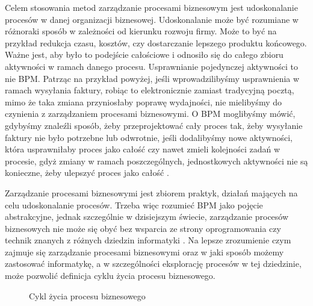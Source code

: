 Celem stosowania metod zarządzanie procesami biznesowym jest udoskonalanie procesów w danej organizacji biznesowej. Udoskonalanie może być rozumiane w różnoraki sposób w zależności od kierunku rozwoju firmy. Może to być na przykład redukcja czasu, kosztów, czy dostarczanie lepszego produktu końcowego. Ważne jest, aby było to podejście całościowe i odnosiło się do całego zbioru aktywności w ramach danego procesu. Usprawnianie pojedynczej aktywności to nie BPM. Patrząc na przykład powyżej, jeśli wprowadzilibyśmy usprawnienia w ramach wysyłania faktury, robiąc to elektronicznie zamiast tradycyjną pocztą, mimo że taka zmiana przyniosłaby poprawę wydajności, nie mielibyśmy do czynienia z zarządzaniem procesami biznesowymi. O BPM moglibyśmy mówić, gdybyśmy  znaleźli sposób, żeby przeprojektować cały proces tak, żeby wysyłanie faktury nie było potrzebne lub odwrotnie, jeśli dodalibyśmy nowe aktywności, która usprawniłaby proces jako całość czy nawet zmieli kolejności zadań w procesie, gdyż zmiany w ramach poszczególnych, jednostkowych aktywności nie są konieczne, żeby ulepszyć proces jako całość \cite{BPMWhat}.

Zarządzanie procesami biznesowymi jest zbiorem praktyk, działań mających na celu udoskonalanie procesów. Trzeba więc rozumieć BPM jako pojęcie abstrakcyjne, jednak szczególnie w dzisiejszym świecie, zarządzanie procesów biznesowych nie może się obyć bez wsparcia ze strony oprogramowania czy technik znanych z różnych dziedzin informatyki \cite{BPMSurvey}. Na lepsze zrozumienie czym zajmuje się zarządzanie procesami biznesowymi oraz w jaki sposób możemy zastosować informatykę, a w szczególności eksplorację procesów w tej dziedzinie, może pozwolić definicja cyklu życia procesu biznesowego.

\begin{figure}[h]
	\caption{\label{fig:lifecycle}Cykl życia procesu biznesowego}
\end{figure}


